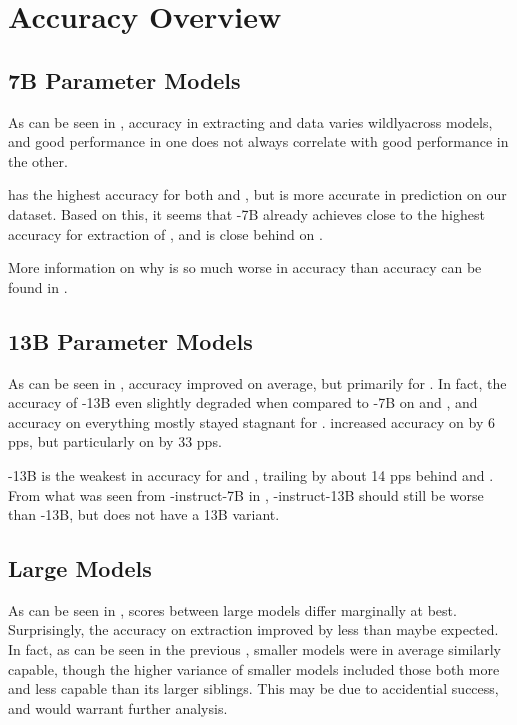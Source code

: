 \section{Accuracy Overview}\label{sec:result:first}

\subsection{7B Parameter Models}\label{sub:result:7b}
As can be seen in , accuracy in extracting \ttemp and \ttime data varies wildlyacross models, and good performance in one does not always correlate with good performance in the other.

 has the highest accuracy for both \ttemp and \ttime, but  is more accurate in \tsolv prediction on our dataset.
Based on this, it seems that -7B already achieves close to the highest accuracy for extraction of \ttemp, and is close behind on \ttime.

More information on why  is so much worse in \ttime accuracy than \ttemp accuracy can be found in .


\subsection{13B Parameter Models}\label{sub:result:13b}

As can be seen in , accuracy improved on average, but primarily for .
In fact, the accuracy of -13B even slightly degraded when compared to -7B on \ttemp and \ttime, and accuracy on everything mostly stayed stagnant for .
 increased accuracy on \ttemp by 6 \glspl{pp}, but particularly on \ttime by 33 \glspl{pp}.

-13B is the weakest in accuracy for \ttemp and \ttime, trailing by about 14 \glspl{pp} behind  and .
From what was seen from -instruct-7B in , -instruct-13B should still be worse than -13B, but  does not have a 13B variant.

\subsection{Large Models}\label{sub:result:large}
As can be seen in , scores between large models differ marginally at best.
Surprisingly, the accuracy on \tsolv extraction improved by less than maybe expected.
In fact, as can be seen in the previous , smaller models were in average similarly capable, though the higher variance of smaller models included those both more and less capable than its larger siblings.
This may be due to accidential success, and would warrant further analysis.




